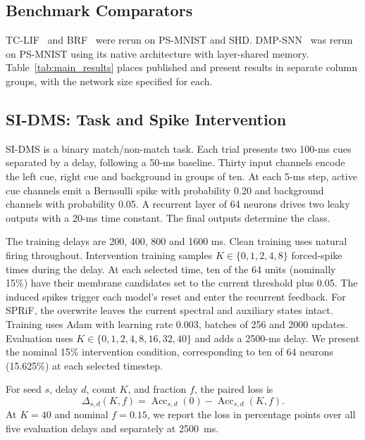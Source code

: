 \documentclass[letterpaper,journal]{IEEEtran}
\DeclareMathOperator{\Acc}{Acc}
\begin{document}
\subsection{Benchmark Comparators}
\label{sec:baselines}

TC-LIF~\cite{tclif} and BRF~\cite{brf} were rerun on PS-MNIST and SHD. DMP-SNN~\cite{sun2026dmp} was rerun on PS-MNIST using its native architecture with layer-shared memory. Table~\ref{tab:main_results} places published and present results in separate column groups, with the network size specified for each.

\subsection{SI-DMS: Task and Spike Intervention}
\label{sec:sidms}

SI-DMS is a binary match/non-match task. Each trial presents two 100-ms cues separated by a delay, following a 50-ms baseline. Thirty input channels encode the left cue, right cue and background in groups of ten. At each 5-ms step, active cue channels emit a Bernoulli spike with probability 0.20 and background channels with probability 0.05. A recurrent layer of 64 neurons drives two leaky outputs with a 20-ms time constant. The final outputs determine the class.

The training delays are 200, 400, 800 and 1600 ms. Clean training uses natural firing throughout. Intervention training samples $K\in\{0,1,2,4,8\}$ forced-spike times during the delay. At each selected time, ten of the 64 units (nominally 15\%) have their membrane candidates set to the current threshold plus 0.05. The induced spikes trigger each model's reset and enter the recurrent feedback. For SPRiF, the overwrite leaves the current spectral and auxiliary states intact. Training uses Adam with learning rate 0.003, batches of 256 and 2000 updates. Evaluation uses $K\in\{0,1,2,4,8,16,32,40\}$ and adds a 2500-ms delay. We present the nominal 15\% intervention condition, corresponding to ten of 64 neurons (15.625\%) at each selected timestep.

For seed $s$, delay $d$, count $K$, and fraction $f$, the paired loss is
\begin{equation}
\Delta_{s,d}(K,f)=
\Acc_{s,d}(0)-\Acc_{s,d}(K,f).
\label{eq:paired_loss}
\end{equation}
At $K=40$ and nominal $f=0.15$, we report the loss in percentage points over all five evaluation delays and separately at 2500~ms.
\end{document}
